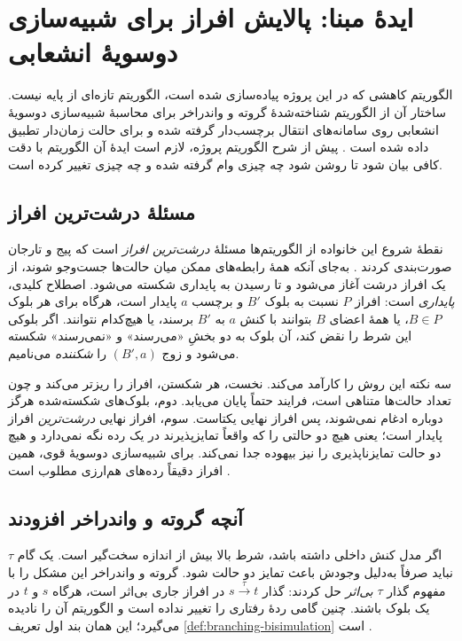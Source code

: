 \section{ایدهٔ مبنا: پالایش افراز برای شبیه‌سازی دوسویهٔ انشعابی}
\label{sec:branching-algorithm}

الگوریتم کاهشی که در این پروژه پیاده‌سازی شده است، الگوریتم تازه‌ای از پایه نیست. ساختار آن از الگوریتم شناخته‌شدهٔ گروته و واندراخر برای محاسبهٔ شبیه‌سازی دوسویهٔ انشعابی روی سامانه‌های انتقال برچسب‌دار گرفته شده و برای حالت زمان‌دار تطبیق داده شده است \cite{GrooteVaandrager1990}. پیش از شرح الگوریتم پروژه، لازم است ایدهٔ آن الگوریتم با دقت کافی بیان شود تا روشن شود چه چیزی وام گرفته شده و چه چیزی تغییر کرده است.

\subsection{مسئلهٔ درشت‌ترین افراز}

نقطهٔ شروع این خانواده از الگوریتم‌ها مسئلهٔ \emph{درشت‌ترین افراز} است که پیج و تارجان صورت‌بندی کردند \cite{PaigeTarjan1987}. به‌جای آنکه همهٔ رابطه‌های ممکن میان حالت‌ها جست‌وجو شوند، از یک افراز درشت آغاز می‌شود و تا رسیدن به پایداری شکسته می‌شود. اصطلاح کلیدی، \emph{پایداری} است: افراز $P$ نسبت به بلوک $B'$ و برچسب $a$ پایدار است، هرگاه برای هر بلوک $B\in P$، یا همهٔ اعضای $B$ بتوانند با کنش $a$ به $B'$ برسند، یا هیچ‌کدام نتوانند. اگر بلوکی این شرط را نقض کند، آن بلوک به دو بخشِ «می‌رسند» و «نمی‌رسند» شکسته می‌شود و زوج $(B',a)$ را \emph{شکننده} می‌نامیم.

سه نکته این روش را کارآمد می‌کند. نخست، هر شکستن، افراز را ریزتر می‌کند و چون تعداد حالت‌ها متناهی است، فرایند حتماً پایان می‌یابد. دوم، بلوک‌های شکسته‌شده هرگز دوباره ادغام نمی‌شوند، پس افراز نهایی یکتاست. سوم، افراز نهایی \emph{درشت‌ترین} افراز پایدار است؛ یعنی هیچ دو حالتی را که واقعاً تمایزپذیرند در یک رده نگه نمی‌دارد و هیچ دو حالت تمایزناپذیری را نیز بیهوده جدا نمی‌کند. برای شبیه‌سازی دوسویهٔ قوی، همین افراز دقیقاً رده‌های هم‌ارزی مطلوب است \cite{PaigeTarjan1987,BaierKatoen2008}.

\subsection{آنچه گروته و واندراخر افزودند}

اگر مدل کنش داخلی داشته باشد، شرط بالا بیش از اندازه سخت‌گیر است. یک گام $\tau$ نباید صرفاً به‌دلیل وجودش باعث تمایز دو حالت شود. گروته و واندراخر این مشکل را با مفهوم گذار $\tau$ \emph{بی‌اثر} حل کردند: گذار $s\xrightarrow{\tau}t$ در افراز جاری بی‌اثر است، هرگاه $s$ و $t$ در یک بلوک باشند. چنین گامی ردهٔ رفتاری را تغییر نداده است و الگوریتم آن را نادیده می‌گیرد؛ این همان بند اول تعریف \ref{def:branching-bisimulation} است \cite{GrooteVaandrager1990,GlabbeekWeijland1996}.

